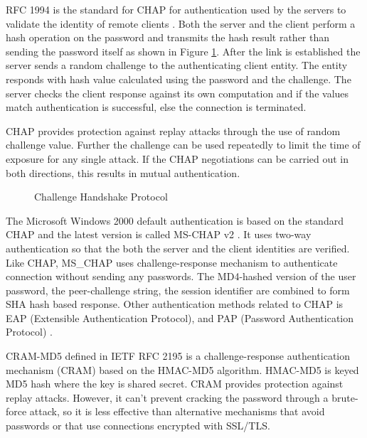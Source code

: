 \begin{multicols}{2}
RFC 1994 is the standard for CHAP for authentication used by the servers to validate the identity of remote clients \cite{key5}. Both the server and the client perform a hash operation on the password and transmits the hash result rather than sending the password itself as shown in Figure \ref{chap2-fig1}. After the link is established the server sends a random challenge to the authenticating client entity. The entity responds with hash value calculated using the password and the challenge. The server checks the client response against its own computation and if the values match authentication is successful, else the connection is terminated.

CHAP provides protection against replay attacks through the use of random challenge value. Further the challenge can be used repeatedly to limit the time of exposure for any single attack. If the CHAP negotiations can be carried out in both directions, this results in mutual authentication.
\begin{figure}[!ht]
\centering
\caption{Challenge Handshake Protocol}\label{chap2-fig1}
\end{figure}

The Microsoft Windows 2000 default authentication is based on the standard CHAP and the latest version is called MS-CHAP v2 \cite{key4}. It uses two-way authentication so that the both the server and the client identities are verified. Like CHAP, MS\_CHAP uses challenge-response mechanism to authenticate connection without sending any passwords. The MD4-hashed version of the user password, the peer-challenge string, the session identifier are combined to form SHA hash based response. Other authentication methods related to CHAP is EAP (Extensible Authentication Protocol), and PAP (Password Authentication Protocol) \cite{key4}.

CRAM-MD5 defined in IETF RFC 2195 \cite{key6} is a challenge-response authentication mechanism (CRAM) based on the HMAC-MD5 algorithm. HMAC-MD5 is keyed MD5 hash where the key is shared secret. CRAM provides protection against replay attacks. However, it can't prevent cracking the password through a brute-force attack, so it is less effective than alternative mechanisms that avoid passwords or that use connections encrypted with SSL/TLS. 


\end{multicols}
